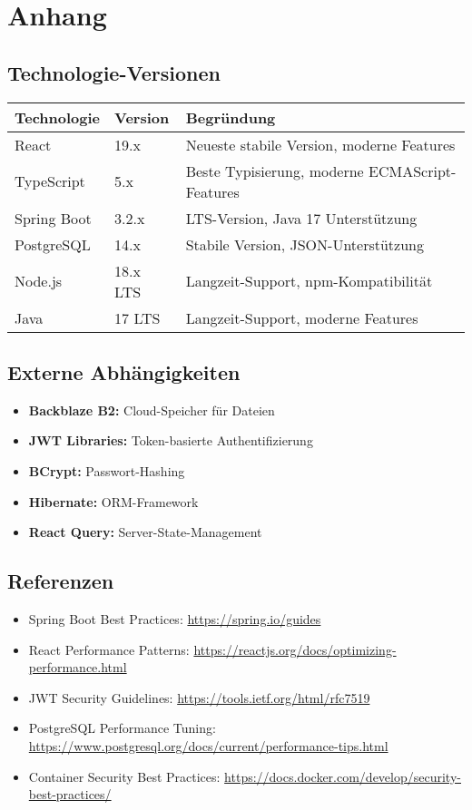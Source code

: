 \documentclass[a4paper,12pt]{article}
\begin{document}
\section{Anhang}

\subsection{Technologie-Versionen}
\begin{longtable}{|p{}|p{}|p{}|}
\hline
\textbf{Technologie} & \textbf{Version} & \textbf{Begründung} \\
\hline
React & 19.x & Neueste stabile Version, moderne Features \\
\hline
TypeScript & 5.x & Beste Typisierung, moderne ECMAScript-Features \\
\hline
Spring Boot & 3.2.x & LTS-Version, Java 17 Unterstützung \\
\hline
PostgreSQL & 14.x & Stabile Version, JSON-Unterstützung \\
\hline
Node.js & 18.x LTS & Langzeit-Support, npm-Kompatibilität \\
\hline
Java & 17 LTS & Langzeit-Support, moderne Features \\
\hline
\end{longtable}

\subsection{Externe Abhängigkeiten}
\begin{itemize}
    \item \textbf{Backblaze B2:} Cloud-Speicher für Dateien
    \item \textbf{JWT Libraries:} Token-basierte Authentifizierung
    \item \textbf{BCrypt:} Passwort-Hashing
    \item \textbf{Hibernate:} ORM-Framework
    \item \textbf{React Query:} Server-State-Management
\end{itemize}

\subsection{Referenzen}
\begin{itemize}
    \item Spring Boot Best Practices: \url{https://spring.io/guides}
    \item React Performance Patterns: \url{https://reactjs.org/docs/optimizing-performance.html}
    \item JWT Security Guidelines: \url{https://tools.ietf.org/html/rfc7519}
    \item PostgreSQL Performance Tuning: \url{https://www.postgresql.org/docs/current/performance-tips.html}
    \item Container Security Best Practices: \url{https://docs.docker.com/develop/security-best-practices/}
\end{itemize}
\end{document}
